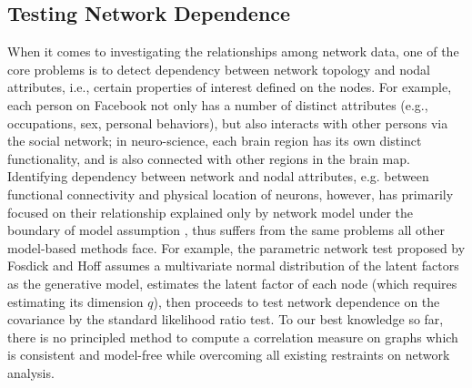 \documentclass[11pt]{article}
\theoremstyle{definition}
\begin{document}
	\subsection{Testing Network Dependence}
	When it comes to investigating the relationships among network data, one of the core problems is to detect dependency between network topology and nodal attributes, i.e., certain properties of interest defined on the nodes. For example, each person on Facebook not only has a number of distinct attributes (e.g., occupations, sex, personal behaviors), but also interacts with other persons via the social network; in neuro-science, each brain region has its own distinct functionality, and is also connected with other regions in the brain map. Identifying dependency between network and nodal attributes, e.g. between functional connectivity and physical location of neurons, however, has primarily focused on their relationship explained only by network model under the boundary of model assumption \cite{wasserman1996logit, fosdick2015testing, howard2016understanding}, thus suffers from the same problems all other model-based methods face. For example, the parametric network test proposed by Fosdick and Hoff \cite{fosdick2015testing} assumes a multivariate normal distribution of the latent factors as the generative model, estimates the latent factor of each node (which requires estimating its dimension $q$), then proceeds to test network dependence on the covariance by the standard likelihood ratio test. To our best knowledge so far, there is no principled method to compute a correlation measure on graphs which is consistent and model-free while overcoming all existing restraints on network analysis. 
	
\end{document}
